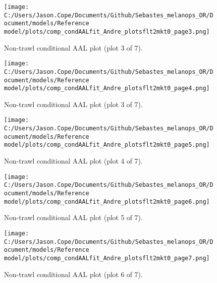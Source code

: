\documentclass[11pt,
  letterpaper,
]{article}
\begin{document}
\begin{figure}
{\centering
\texttt{[image: C:/Users/Jason.Cope/Documents/Github/Sebastes\_melanops\_OR/Document/models/Reference model/plots/comp\_condAALfit\_Andre\_plotsflt2mkt0\_page3.png]}
}
\caption{Non-trawl conditional AAL plot (plot 3 of 7).\label{fig:comp_condAALfit_Andre_plotsflt2mkt0_page3}}
\end{figure}

\begin{figure}
{\centering
\texttt{[image: C:/Users/Jason.Cope/Documents/Github/Sebastes\_melanops\_OR/Document/models/Reference model/plots/comp\_condAALfit\_Andre\_plotsflt2mkt0\_page4.png]}
}
\caption{Non-trawl conditional AAL plot (plot 3 of 7).\label{fig:comp_condAALfit_Andre_plotsflt2mkt0_page4}}
\end{figure}

\begin{figure}
{\centering
\texttt{[image: C:/Users/Jason.Cope/Documents/Github/Sebastes\_melanops\_OR/Document/models/Reference model/plots/comp\_condAALfit\_Andre\_plotsflt2mkt0\_page5.png]}
}
\caption{Non-trawl conditional AAL plot (plot 4 of 7).\label{fig:comp_condAALfit_Andre_plotsflt2mkt0_page5}}
\end{figure}

\begin{figure}
{\centering
\texttt{[image: C:/Users/Jason.Cope/Documents/Github/Sebastes\_melanops\_OR/Document/models/Reference model/plots/comp\_condAALfit\_Andre\_plotsflt2mkt0\_page6.png]}
}
\caption{Non-trawl conditional AAL plot (plot 5 of 7).\label{fig:comp_condAALfit_Andre_plotsflt2mkt0_page6}}
\end{figure}

\begin{figure}
{\centering
\texttt{[image: C:/Users/Jason.Cope/Documents/Github/Sebastes\_melanops\_OR/Document/models/Reference model/plots/comp\_condAALfit\_Andre\_plotsflt2mkt0\_page7.png]}
}
\caption{Non-trawl conditional AAL plot (plot 6 of 7).\label{fig:comp_condAALfit_Andre_plotsflt2mkt0_page7}}
\end{figure}
\end{document}
